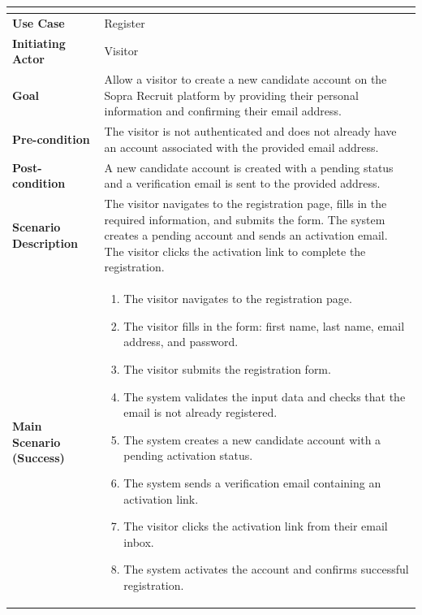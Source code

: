 \setlength{\tabcolsep}{4pt}
\renewcommand{\arraystretch}{1.6}
\begin{table}[H]
\centering
\small
\begin{tabularx}{\textwidth}{|>{\bfseries\arraybackslash}p{2cm}|X|}
\hline
\rowcolor{headerblue}
\multicolumn{2}{|c|}{\textbf{Use Case: Register}} \\
\hline
Use Case            & Register \\
\hline
Initiating Actor    & Visitor \\
\hline
Goal                & Allow a visitor to create a new candidate account on the Sopra Recruit platform by providing their personal information and confirming their email address. \\
\hline
Pre-condition       & The visitor is not authenticated and does not already have an account associated with the provided email address. \\
\hline
Post-condition      & A new candidate account is created with a pending status and a verification email is sent to the provided address. \\
\hline
Scenario Description &
The visitor navigates to the registration page, fills in the required information, and submits the form. The system creates a pending account and sends an activation email. The visitor clicks the activation link to complete the registration. \\
\hline
Main Scenario (Success) &
\begin{enumerate}[leftmargin=*, label=\arabic*., topsep=0pt, itemsep=0pt]
    \item The visitor navigates to the registration page.
    \item The visitor fills in the form: first name, last name, email address, and password.
    \item The visitor submits the registration form.
    \item The system validates the input data and checks that the email is not already registered.
    \item The system creates a new candidate account with a pending activation status.
    \item The system sends a verification email containing an activation link.
    \item The visitor clicks the activation link from their email inbox.
    \item The system activates the account and confirms successful registration.
\end{enumerate} \\

\end{tabularx}
\end{table}
